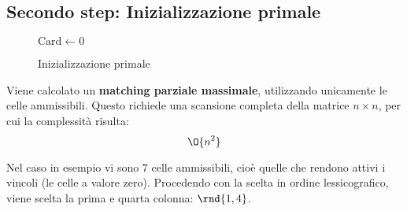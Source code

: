 \documentclass[\main/main.tex]{subfiles}
\begin{document}
\subsection{Secondo step: Inizializzazione primale}
\begin{figure}
	\begin{algorithm}[H]
		\SetAlgoLined
		\(\text{Card} \leftarrow 0\)\;
		\caption{Inizializzazione primale}
	\end{algorithm}
\end{figure}
\begin{complexity}
	Viene calcolato un \textbf{matching parziale massimale}, utilizzando unicamente le celle ammissibili. Questo richiede una scansione completa della matrice \(n\times n\), per cui la complessità risulta:
	\[
		\O{n^2}
	\]
\end{complexity}
Nel caso in esempio vi sono \(7\) celle ammissibili, cioè quelle che rendono attivi i vincoli (le celle a valore zero). Procedendo con la scelta in ordine lessicografico, viene scelta la prima e quarta colonna: \(\rnd{1, 4}\).
\end{document}
